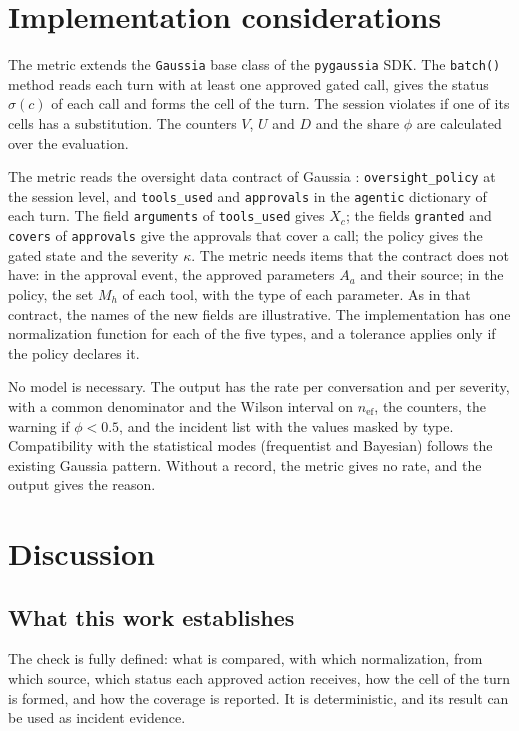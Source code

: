 \documentclass[11pt,a4paper]{article}
\begin{document}
\section{Implementation considerations}

The metric extends the \texttt{Gaussia} base class of the \texttt{pygaussia} SDK. The \texttt{batch()} method reads each turn with at least one
approved gated call, gives the status $\sigma(c)$ of each call and forms the cell of the turn. The session
violates if one of its cells has a substitution. The counters $V$, $U$ and $D$ and the share $\phi$ are
calculated over the evaluation.

The metric reads the oversight data contract of Gaussia \cite{gaussia2026}: \texttt{oversight\_policy} at the session
level, and \texttt{tools\_used} and \texttt{approvals} in the \texttt{agentic} dictionary of each turn. The field \texttt{arguments} of \texttt{tools\_used} gives $X_c$; the fields
\texttt{granted} and \texttt{covers} of \texttt{approvals} give the approvals that cover a call; the policy gives
the gated state and the severity $\kappa$. The metric needs items that the contract does not have: in the
approval event, the approved parameters $A_a$ and their source; in the policy, the set $M_h$ of each tool,
with the type of each parameter. As in that contract, the names of the new fields are illustrative. The implementation has one normalization function for each of
the five types, and a tolerance applies only if the policy declares it.

No model is necessary. The output has the rate per conversation and per severity, with a common denominator and
the Wilson interval on $n_{\mathrm{ef}}$, the counters, the warning if $\phi < 0.5$, and the incident list with
the values masked by type. Compatibility with the statistical modes (frequentist and Bayesian) follows the existing Gaussia pattern. Without a record, the metric gives no rate, and the output gives the
reason.

\section{Discussion}

\subsection{What this work establishes}

The check is fully defined: what is compared, with which normalization, from which source, which status each
approved action receives, how the cell of the turn is formed, and how the coverage is reported. It is
deterministic, and its result can be used as incident evidence.
\end{document}
